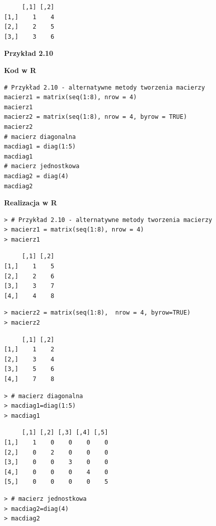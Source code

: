 \documentclass[12pt,B5paper,]{book}
\begin{document}
\begin{verbatim}
     [,1] [,2]
[1,]    1    4
[2,]    2    5
[3,]    3    6
\end{verbatim}

\vspace{0.8cm}

\textbf{Przykład 2.10}

\textbf{Kod w R}

\begin{verbatim}
# Przykład 2.10 - alternatywne metody tworzenia macierzy
macierz1 = matrix(seq(1:8), nrow = 4)
macierz1
macierz2 = matrix(seq(1:8), nrow = 4, byrow = TRUE)
macierz2
# macierz diagonalna
macdiag1 = diag(1:5)
macdiag1
# macierz jednostkowa
macdiag2 = diag(4)
macdiag2
\end{verbatim}

\vspace{0.8cm} \textbf{Realizacja w R}

\begin{verbatim}
> # Przykład 2.10 - alternatywne metody tworzenia macierzy
> macierz1 = matrix(seq(1:8), nrow = 4)
> macierz1
\end{verbatim}

\begin{verbatim}
     [,1] [,2]
[1,]    1    5
[2,]    2    6
[3,]    3    7
[4,]    4    8
\end{verbatim}

\begin{verbatim}
> macierz2 = matrix(seq(1:8),  nrow = 4, byrow=TRUE)
> macierz2
\end{verbatim}

\begin{verbatim}
     [,1] [,2]
[1,]    1    2
[2,]    3    4
[3,]    5    6
[4,]    7    8
\end{verbatim}

\begin{verbatim}
> # macierz diagonalna
> macdiag1=diag(1:5)      
> macdiag1
\end{verbatim}

\begin{verbatim}
     [,1] [,2] [,3] [,4] [,5]
[1,]    1    0    0    0    0
[2,]    0    2    0    0    0
[3,]    0    0    3    0    0
[4,]    0    0    0    4    0
[5,]    0    0    0    0    5
\end{verbatim}

\begin{verbatim}
> # macierz jednostkowa
> macdiag2=diag(4)      
> macdiag2
\end{verbatim}
\end{document}
